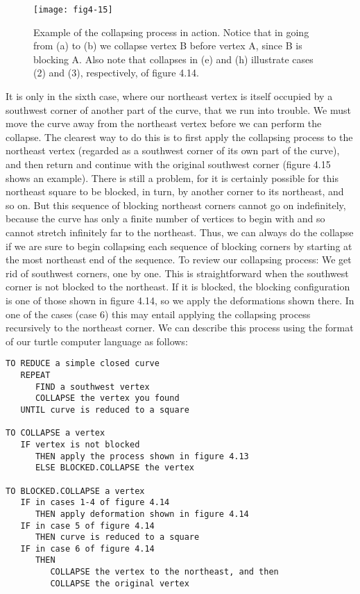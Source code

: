 \documentclass{book}
\begin{document}
\begin{figure}
\begin{center}
\texttt{[image: fig4-15]}
\caption{Example of the collapsing process in action. Notice that in going from (a) to (b) we collapse vertex B before vertex A, since B is blocking A. Also note that collapses in (e) and (h) illustrate cases (2) and (3), respectively, of figure 4.14.}
\end{center}
\end{figure}

It is only in the sixth case, where our northeast vertex is itself occupied
by a southwest corner of another part of the curve, that we run into
trouble. We must move the curve away from the northeast vertex before
we can perform the collapse. The clearest way to do this is to first apply
the collapsing process to the northeast vertex (regarded as a southwest
corner of its own part of the curve), and then return and continue with
the original southwest corner (figure 4.15 shows an example). There is
still a problem, for it is certainly possible for this northeast square to
be blocked, in turn, by another corner to its northeast, and so on. But
this sequence of blocking northeast corners cannot go on indefinitely,
because the curve has only a finite number of vertices to begin with and
so cannot stretch infinitely far to the northeast. Thus, we can always do
the collapse if we are sure to begin collapsing each sequence of blocking
corners by starting at the most northeast end of the sequence.
To review our collapsing process: We get rid of southwest corners,
one by one. This is straightforward when the southwest corner is not
blocked to the northeast. If it is blocked, the blocking configuration is
one of those shown in figure 4.14, so we apply the deformations shown
there. In one of the cases (case 6) this may entail applying the collapsing
process recursively to the northeast corner. We can describe this process
using the format of our turtle computer language as follows:

\begin{verbatim}
TO REDUCE a simple closed curve
   REPEAT
      FIND a southwest vertex
      COLLAPSE the vertex you found
   UNTIL curve is reduced to a square

TO COLLAPSE a vertex
   IF vertex is not blocked
      THEN apply the process shown in figure 4.13
      ELSE BLOCKED.COLLAPSE the vertex

TO BLOCKED.COLLAPSE a vertex
   IF in cases 1-4 of figure 4.14
      THEN apply deformation shown in figure 4.14
   IF in case 5 of figure 4.14
      THEN curve is reduced to a square
   IF in case 6 of figure 4.14
      THEN
         COLLAPSE the vertex to the northeast, and then
         COLLAPSE the original vertex
\end{verbatim}
\end{document}
